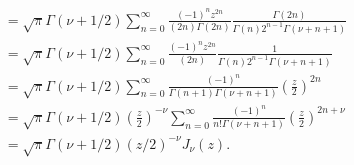 \documentclass[a4paper,12pt, leqno, answers]{exam}
\begin{document}
\begin{questions}
\begin{solution}
\begin{align*}
            &= \sqrt{\pi} \Gamma(\nu + 1/2) \sum_{n = 0}^\infty \frac{(-1)^n z^{2n}}{(2n) \Gamma(2n)} \frac{\Gamma(2n)}{\Gamma(n) 2^{n - 1} \Gamma(\nu + n + 1)} \\
            &= \sqrt{\pi} \Gamma(\nu + 1/2) \sum_{n = 0}^\infty \frac{(-1)^n z^{2n}}{(2n)} \frac{1}{\Gamma(n) 2^{n - 1} \Gamma(\nu + n + 1)} \\
            &= \sqrt{\pi} \Gamma(\nu + 1/2) \sum_{n = 0}^\infty \frac{(-1)^n}{\Gamma(n + 1) \Gamma(\nu + n + 1)} \left( \frac{z}{2} \right)^{2n} \\
            &= \sqrt{\pi} \Gamma(\nu + 1/2) \left( \frac{z}{2} \right)^{-\nu} \sum_{n = 0}^\infty \frac{(-1)^n}{n! \Gamma(\nu + n + 1)} \left( \frac{z}{2} \right)^{2 n + \nu} \\
            &= \sqrt{\pi} \Gamma(\nu + 1/2) (z/2)^{- \nu} J_\nu(z).
        \end{align*}
    \end{solution}


\end{questions}
\end{document}
